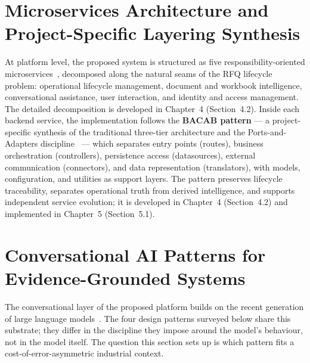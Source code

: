 \section{Microservices Architecture and Project-Specific Layering Synthesis}
At platform level, the proposed system is structured as five responsibility-oriented microservices~\cite{newman2021microservices}, decomposed along the natural seams of the RFQ lifecycle problem: operational lifecycle management, document and workbook intelligence, conversational assistance, user interaction, and identity and access management. The detailed decomposition is developed in Chapter~4 (Section~4.2). Inside each backend service, the implementation follows the \textbf{BACAB pattern} --- a project-specific synthesis of the traditional three-tier architecture and the Ports-and-Adapters discipline~\cite{cockburn2005hexagonal} --- which separates entry points (routes), business orchestration (controllers), persistence access (datasources), external communication (connectors), and data representation (translators), with models, configuration, and utilities as support layers. The pattern preserves lifecycle traceability, separates operational truth from derived intelligence, and supports independent service evolution; it is developed in Chapter~4 (Section~4.2) and implemented in Chapter~5 (Section~5.1).

\section{Conversational AI Patterns for Evidence-Grounded Systems}
The conversational layer of the proposed platform builds on the recent generation of large language models~\cite{brown2020gpt3}. The four design patterns surveyed below share this substrate; they differ in the discipline they impose around the model's behaviour, not in the model itself. The question this section sets up is which pattern fits a cost-of-error-asymmetric industrial context.

